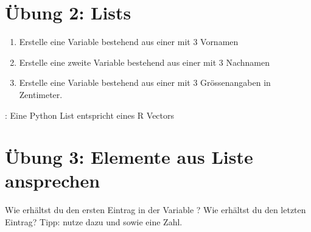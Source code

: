 \documentclass[letterpaper,10pt,english]{sphinxmanual}
\begin{document}
\section{Übung 2: Lists}
\label{\detokenize{01_02_Python_Basics:ubung-2-lists}}\begin{enumerate}
%
\item {} 
Erstelle eine Variable  bestehend aus einer  mit 3 Vornamen

\item {} 
Erstelle eine zweite Variable  bestehend aus einer  mit 3 Nachnamen

\item {} 
Erstelle eine Variable  bestehend aus einer  mit 3 Grössenangaben in Zentimeter.

\end{enumerate}

: Eine Python List entspricht eines R Vectors

\begin{sphinxVerbatim}[commandchars=\\\{\}]
  \PYG{p}{[}  \PYG{p}{]}
  \PYG{p}{[} \PYG{p}{]}

  \PYG{p}{[}  \PYG{p}{]}
\end{sphinxVerbatim}


\section{Übung 3: Elemente aus Liste ansprechen}
\label{\detokenize{01_02_Python_Basics:ubung-3-elemente-aus-liste-ansprechen}}
Wie erhältst du den ersten Eintrag in der Variable ? Wie erhältst du den letzten Eintrag? Tipp: nutze dazu \sphinxcode{\sphinxupquote{{[}}} und \sphinxcode{\sphinxupquote{{]}}} sowie eine Zahl.
\end{document}
